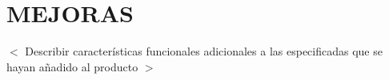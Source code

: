 \chapter{ MEJORAS}

$<$ Describir características funcionales adicionales a las especificadas que se hayan añadido al producto $>$
